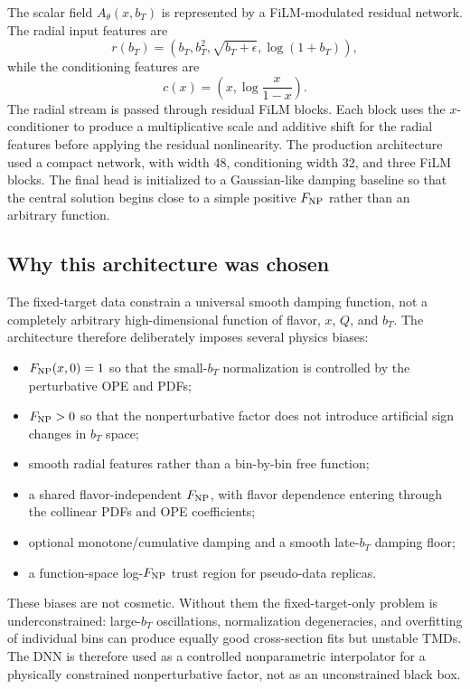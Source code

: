 \documentclass[11pt]{article}
\newcommand{\bt}{b_T}
\newcommand{\FNP}{F_{\rm NP}}
\begin{document}
The scalar field $A_\theta(x,\bt)$ is represented by a FiLM-modulated residual network.  The radial input features are
\begin{equation}
  r(\bt)=\left(\bt,\bt^2,\sqrt{\bt+\epsilon},\log(1+\bt)\right),
\end{equation}
while the conditioning features are
\begin{equation}
  c(x)=\left(x,\log\frac{x}{1-x}\right).
\end{equation}
The radial stream is passed through residual FiLM blocks.  Each block uses the $x$-conditioner to produce a multiplicative scale and additive shift for the radial features before applying the residual nonlinearity.  The production architecture used a compact network, with width 48, conditioning width 32, and three FiLM blocks.  The final head is initialized to a Gaussian-like damping baseline so that the central solution begins close to a simple positive $\FNP$ rather than an arbitrary function.

\subsection{Why this architecture was chosen}

The fixed-target data constrain a universal smooth damping function, not a completely arbitrary high-dimensional function of flavor, $x$, $Q$, and $\bt$.  The architecture therefore deliberately imposes several physics biases:
\begin{itemize}
  \item $\FNP(x,0)=1$ so that the small-$\bt$ normalization is controlled by the perturbative OPE and PDFs;
  \item $\FNP>0$ so that the nonperturbative factor does not introduce artificial sign changes in $\bt$ space;
  \item smooth radial features rather than a bin-by-bin free function;
  \item a shared flavor-independent $\FNP$, with flavor dependence entering through the collinear PDFs and OPE coefficients;
  \item optional monotone/cumulative damping and a smooth late-$\bt$ damping floor;
  \item a function-space log-$\FNP$ trust region for pseudo-data replicas.
\end{itemize}
These biases are not cosmetic.  Without them the fixed-target-only problem is underconstrained: large-$\bt$ oscillations, normalization degeneracies, and overfitting of individual bins can produce equally good cross-section fits but unstable TMDs.  The DNN is therefore used as a controlled nonparametric interpolator for a physically constrained nonperturbative factor, not as an unconstrained black box.
\end{document}
